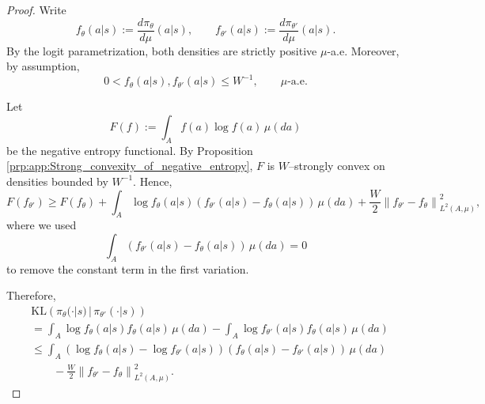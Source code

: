 \documentclass{amsart}
\theoremstyle{definition}
\begin{document}
\begin{proof}
Write
\[
f_\theta(a|s):=\frac{d\pi_\theta}{d\mu}(a|s),
\qquad
f_{\theta'}(a|s):=\frac{d\pi_{\theta'}}{d\mu}(a|s).
\]
By the logit parametrization, both densities are strictly positive
$\mu$-a.e. Moreover, by assumption,
\[
0<f_\theta(a|s),f_{\theta'}(a|s)\le W^{-1},
\qquad \mu\text{-a.e.}
\]

Let
\[
F(f):=\int_{ A} f(a)\log f(a)\,\mu(da)
\]
be the negative entropy functional. By Proposition
\ref{prp:app:Strong_convexity_of_negative_entropy}, $F$ is
$W$--strongly convex on densities bounded by $W^{-1}$. Hence,
\[
F(f_{\theta'})
\ge
F(f_\theta)
+
\int_{ A}
\log f_\theta(a|s)
\left(
f_{\theta'}(a|s)-f_\theta(a|s)
\right)\,\mu(da)
+
\frac{W}{2}
\left\|
f_{\theta'}-f_\theta
\right\|_{L^2(A,\mu)}^2,
\]
where we used
\[
\int_{ A}
\left(
f_{\theta'}(a|s)-f_\theta(a|s)
\right)\,\mu(da)=0
\]
to remove the constant term in the first variation.

Therefore,
\begin{align*}
&\mathrm{KL}\left(
\pi_\theta(\cdot|s)\,|\,\pi_{\theta'}(\cdot|s)
\right) \\
&=
\int_{ A}
\log f_\theta(a|s) f_\theta(a|s)\,\mu(da)
-
\int_{ A}
\log f_{\theta'}(a|s) f_\theta(a|s)\,\mu(da) \\
&\le
\int_{ A}
\left(
\log f_\theta(a|s)-\log f_{\theta'}(a|s)
\right)
\left(
f_\theta(a|s)-f_{\theta'}(a|s)
\right)\,\mu(da) \\
&\qquad
-
\frac{W}{2}
\left\|
f_{\theta'}-f_\theta
\right\|_{L^2(A,\mu)}^2 .
\end{align*}


\end{proof}
\end{document}
